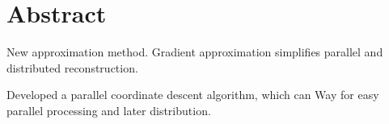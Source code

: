 \section*{Abstract}

New approximation method.
Gradient approximation
simplifies parallel and distributed reconstruction.

Developed a parallel coordinate descent algorithm, which can 
Way for easy parallel processing and later distribution.

